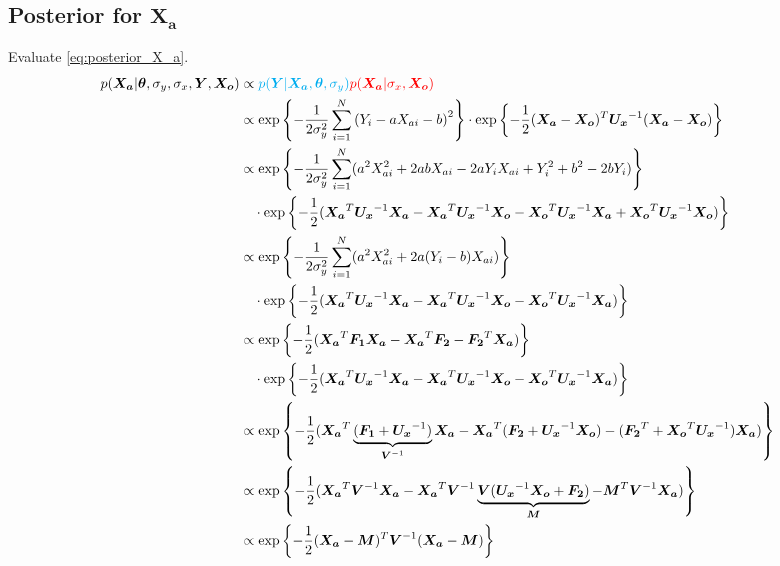 \documentclass[10pt]{article}
\renewcommand{\vec}[1]{\boldsymbol{#1}}
\newcommand{\mat}[1]{\boldsymbol{#1}}
\begin{document}
\subsection{Posterior for $\vec{X_a}$}
Evaluate \cref{eq:posterior_X_a}.
\begin{align}
    p(\vec{X_a} | \vec{\theta}, \sigma_y, \sigma_x, \vec{Y}, \vec{X_o}) &\propto {\color{cyan} p(\vec{Y} | \vec{X_a}, \vec{\theta}, \sigma_y)} {\color{red} p(\vec{X_a} | \sigma_x, \vec{X_o})} \\
    &\propto \exp\left\{ - \frac{1}{2\sigma_y^2} \sum_{i=1}^N \left( Y_i - a X_{ai} - b \right)^2 \right\} \cdot \exp\left\{ - \frac{1}{2} (\vec{X_a} - \vec{X_o})^T \mat{U_x}^{-1} (\vec{X_a} - \vec{X_o}) \right\} \\
    
    &\propto \exp\left\{ - \frac{1}{2\sigma_y^2} \sum_{i=1}^N (a^2 X_{ai}^2  + 2 a b X_{ai} - 2 a Y_i X_{ai} + Y_i^2 + b^2 -2 b Y_i) \right\} \nonumber \\
    &\quad \cdot \exp\left\{ - \frac{1}{2} ( \vec{X_a}^T \mat{U_x}^{-1} \vec{X_a} - \vec{X_a}^T \mat{U_x}^{-1} \vec{X_o} -\vec{X_o}^T \mat{U_x}^{-1} \vec{X_a} + \vec{X_o}^T \mat{U_x}^{-1} \vec{X_o} ) \right\} \\
    
    &\propto \exp\left\{ - \frac{1}{2\sigma_y^2} \sum_{i=1}^N (a^2 X_{ai}^2  + 2 a (Y_i - b) X_{ai} ) \right\} \nonumber \\
    &\quad \cdot \exp\left\{ - \frac{1}{2} ( \vec{X_a}^T \mat{U_x}^{-1} \vec{X_a} - \vec{X_a}^T \mat{U_x}^{-1} \vec{X_o} -\vec{X_o}^T \mat{U_x}^{-1} \vec{X_a}) \right\} \\
    
    &\propto \exp\left\{ - \frac{1}{2} (\vec{X_a}^T \mat{F_1} \vec{X_a} - \vec{X_a}^T \vec{F_2} - \vec{F_2}^T \vec{X_a}) \right\} \nonumber \\
    &\quad \cdot \exp\left\{ - \frac{1}{2} ( \vec{X_a}^T \mat{U_x}^{-1} \vec{X_a} - \vec{X_a}^T \mat{U_x}^{-1} \vec{X_o} -\vec{X_o}^T \mat{U_x}^{-1} \vec{X_a}) \right\} \\
    
    &\propto \exp\left\{ - \frac{1}{2} (\vec{X_a}^T \underbrace{(\mat{F_1} + \mat{U_x}^{-1})}_{\mat{V}^{-1}} \vec{X_a} - \vec{X_a}^T (\vec{F_2} + \mat{U_x}^{-1} \vec{X_o}) - (\vec{F_2}^T + \vec{X_o}^T \mat{U_x}^{-1}) \vec{X_a}) \right\} \\
    
    &\propto \exp\left\{ - \frac{1}{2} (\vec{X_a}^T \mat{V}^{-1} \vec{X_a} - \vec{X_a}^T \mat{V}^{-1} \underbrace{\mat{V} (\mat{U_x}^{-1} \vec{X_o} + \vec{F_2}) }_{\vec{M}} - \vec{M}^T \mat{V}^{-1} \vec{X_a}) \right\} \\
    
    &\propto \exp\left\{ - \frac{1}{2} (\vec{X_a} - \vec{M})^T \mat{V}^{-1} (\vec{X_a} - \vec{M}) \right\}  \label{eq:posterior_Xa}

\end{align}
\end{document}
